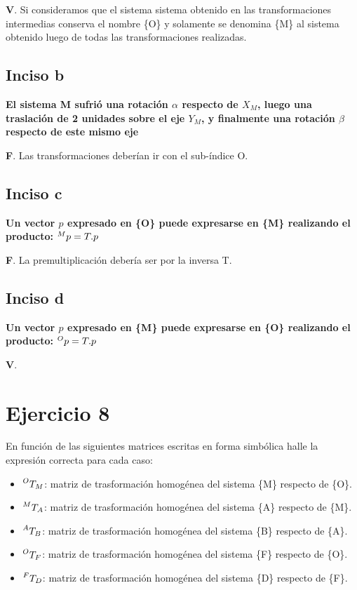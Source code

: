 \documentclass[a4paper,12pt]{article}
\begin{document}
\textbf{V}. Si consideramos que el sistema sistema obtenido en las transformaciones intermedias
conserva el nombre \{O\} y solamente se denomina \{M\} al sistema obtenido luego de todas las transformaciones realizadas.

\subsection{Inciso b}
\textbf{El sistema {M} sufrió una rotación $\alpha$ respecto de $X_M$, luego una traslación de 2
unidades sobre el eje $Y_M$, y finalmente una rotación $\beta$ respecto de este mismo eje}
\vspace*{0.5 cm}

\textbf{F}. Las transformaciones deberían ir con el sub-índice O.

\subsection{Inciso c}
\textbf{Un vector $p$ expresado en \{O\} puede expresarse en \{M\} realizando el producto: $\prescript{M}{}{p} =
T. p$}
\vspace*{0.5 cm}

\textbf{F}. La premultiplicación debería ser por la inversa T.

\subsection{Inciso d}
\textbf{Un vector $p$ expresado en \{M\} puede expresarse en \{O\} realizando el producto: $\prescript{O}{}{p} =
T. p$}
\vspace*{0.5 cm}

\textbf{V}.

\section{Ejercicio 8}
En función de las siguientes matrices escritas en forma simbólica halle la expresión
correcta para cada caso:

\begin{itemize}
    \item $\prescript{O}{}{T_M}$: matriz de trasformación homogénea del sistema \{M\} respecto de \{O\}.
    \item $\prescript{M}{}{T_A}$: matriz de trasformación homogénea del sistema \{A\} respecto de \{M\}.
    \item $\prescript{A}{}{T_B}$: matriz de trasformación homogénea del sistema \{B\} respecto de \{A\}.
    \item $\prescript{O}{}{T_F}$: matriz de trasformación homogénea del sistema \{F\} respecto de \{O\}.
    \item $\prescript{F}{}{T_D}$: matriz de trasformación homogénea del sistema \{D\} respecto de \{F\}.
\end{itemize}
\end{document}

